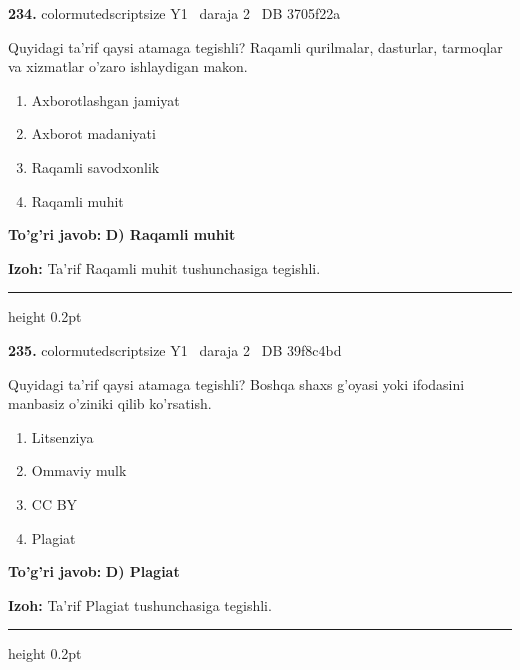 \documentclass[10pt,a4paper,oneside]{article}
\begin{document}
\noindent\textbf{\color{ink}234.}  {color{muted}scriptsize Y1 \textbullet\ daraja 2 \textbullet\ DB 3705f22a}
\par
Quyidagi ta'rif qaysi atamaga tegishli? Raqamli qurilmalar, dasturlar, tarmoqlar va xizmatlar o'zaro ishlaydigan makon.
\begin{enumerate}[label=\Alph*),leftmargin=9mm]
\item Axborotlashgan jamiyat
\item Axborot madaniyati
\item Raqamli savodxonlik
\item Raqamli muhit
\end{enumerate}
\begin{tcolorbox}[enhanced,breakable,colback=teal!4,colframe=teal!50!black,boxrule=0.5pt,arc=1.1mm,left=3mm,right=3mm,top=1.7mm,bottom=1.7mm,before skip=2mm,after skip=2mm]
\textbf{\color{teal}To'g'ri javob:} \textbf{D) Raqamli muhit}
\par\smallskip
\textbf{Izoh:} Ta'rif Raqamli muhit tushunchasiga tegishli.
\end{tcolorbox}
\vspace{2mm}\hrule height 0.2pt \vspace{3mm}

\noindent\textbf{\color{ink}235.}  {color{muted}scriptsize Y1 \textbullet\ daraja 2 \textbullet\ DB 39f8c4bd}
\par
Quyidagi ta'rif qaysi atamaga tegishli? Boshqa shaxs g'oyasi yoki ifodasini manbasiz o'ziniki qilib ko'rsatish.
\begin{enumerate}[label=\Alph*),leftmargin=9mm]
\item Litsenziya
\item Ommaviy mulk
\item CC BY
\item Plagiat
\end{enumerate}
\begin{tcolorbox}[enhanced,breakable,colback=teal!4,colframe=teal!50!black,boxrule=0.5pt,arc=1.1mm,left=3mm,right=3mm,top=1.7mm,bottom=1.7mm,before skip=2mm,after skip=2mm]
\textbf{\color{teal}To'g'ri javob:} \textbf{D) Plagiat}
\par\smallskip
\textbf{Izoh:} Ta'rif Plagiat tushunchasiga tegishli.
\end{tcolorbox}
\vspace{2mm}\hrule height 0.2pt \vspace{3mm}
\end{document}
